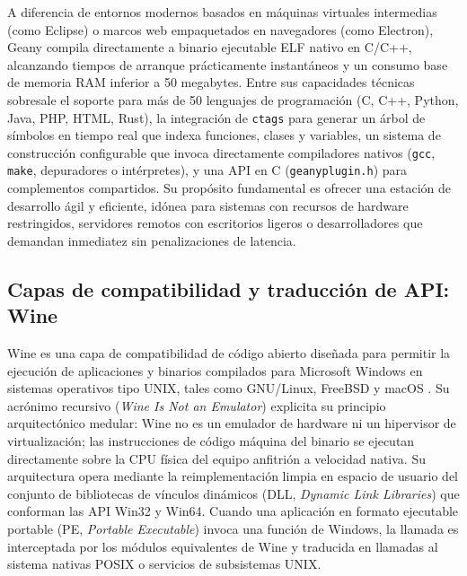 \documentclass[12pt]{article}
\begin{document}
A diferencia de entornos modernos basados en máquinas virtuales intermedias (como Eclipse) o marcos web empaquetados en navegadores (como Electron), Geany compila directamente a binario ejecutable ELF nativo en C/C++, alcanzando tiempos de arranque prácticamente instantáneos y un consumo base de memoria RAM inferior a 50 megabytes. Entre sus capacidades técnicas sobresale el soporte para más de 50 lenguajes de programación (C, C++, Python, Java, PHP, HTML, Rust), la integración de \texttt{ctags} para generar un árbol de símbolos en tiempo real que indexa funciones, clases y variables, un sistema de construcción configurable que invoca directamente compiladores nativos (\texttt{gcc}, \texttt{make}, depuradores o intérpretes), y una API en C (\texttt{geanyplugin.h}) para complementos compartidos. Su propósito fundamental es ofrecer una estación de desarrollo ágil y eficiente, idónea para sistemas con recursos de hardware restringidos, servidores remotos con escritorios ligeros o desarrolladores que demandan inmediatez sin penalizaciones de latencia.

\subsection{Capas de compatibilidad y traducción de API: Wine}
\label{sec:wine}

Wine es una capa de compatibilidad de código abierto diseñada para permitir la ejecución de aplicaciones y binarios compilados para Microsoft Windows en sistemas operativos tipo UNIX, tales como GNU/Linux, FreeBSD y macOS \parencite{wineArchitecture}. Su acrónimo recursivo (\textit{Wine Is Not an Emulator}) explicita su principio arquitectónico medular: Wine no es un emulador de hardware ni un hipervisor de virtualización; las instrucciones de código máquina del binario se ejecutan directamente sobre la CPU física del equipo anfitrión a velocidad nativa. Su arquitectura opera mediante la reimplementación limpia en espacio de usuario del conjunto de bibliotecas de vínculos dinámicos (DLL, \textit{Dynamic Link Libraries}) que conforman las API Win32 y Win64. Cuando una aplicación en formato ejecutable portable (PE, \textit{Portable Executable}) invoca una función de Windows, la llamada es interceptada por los módulos equivalentes de Wine y traducida en llamadas al sistema nativas POSIX o servicios de subsistemas UNIX.
\end{document}
